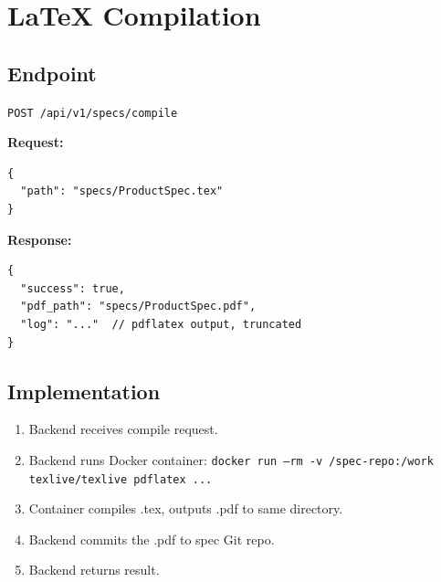 \documentclass[11pt,a4paper]{article}
\begin{document}
\section{LaTeX Compilation}

\subsection{Endpoint}

\texttt{POST /api/v1/specs/compile}

\textbf{Request:}
\begin{lstlisting}
{
  "path": "specs/ProductSpec.tex"
}
\end{lstlisting}

\textbf{Response:}
\begin{lstlisting}
{
  "success": true,
  "pdf_path": "specs/ProductSpec.pdf",
  "log": "..."  // pdflatex output, truncated
}
\end{lstlisting}

\subsection{Implementation}

\begin{enumerate}
  \item Backend receives compile request.
  \item Backend runs Docker container: \texttt{docker run --rm -v /spec-repo:/work texlive/texlive pdflatex ...}
  \item Container compiles .tex, outputs .pdf to same directory.
  \item Backend commits the .pdf to spec Git repo.
  \item Backend returns result.
\end{enumerate}
\end{document}
